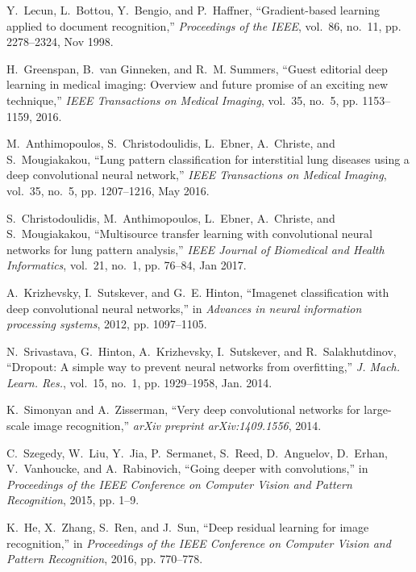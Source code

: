 \documentclass[journal]{IEEEtran}
\begin{document}
Y.~Lecun, L.~Bottou, Y.~Bengio, and P.~Haffner, ``Gradient-based learning
  applied to document recognition,'' \emph{Proceedings of the IEEE}, vol.~86,
  no.~11, pp. 2278--2324, Nov 1998.

H.~Greenspan, B.~van Ginneken, and R.~M. Summers, ``Guest editorial deep
  learning in medical imaging: Overview and future promise of an exciting new
  technique,'' \emph{IEEE Transactions on Medical Imaging}, vol.~35, no.~5, pp.
  1153--1159, 2016.

M.~Anthimopoulos, S.~Christodoulidis, L.~Ebner, A.~Christe, and S.~Mougiakakou,
  ``Lung pattern classification for interstitial lung diseases using a deep
  convolutional neural network,'' \emph{IEEE Transactions on Medical Imaging},
  vol.~35, no.~5, pp. 1207--1216, May 2016.

S.~Christodoulidis, M.~Anthimopoulos, L.~Ebner, A.~Christe, and S.~Mougiakakou,
  ``Multisource transfer learning with convolutional neural networks for lung
  pattern analysis,'' \emph{IEEE Journal of Biomedical and Health Informatics},
  vol.~21, no.~1, pp. 76--84, Jan 2017.

A.~Krizhevsky, I.~Sutskever, and G.~E. Hinton, ``Imagenet classification with
  deep convolutional neural networks,'' in \emph{Advances in neural information
  processing systems}, 2012, pp. 1097--1105.

\BIBentryALTinterwordspacing
N.~Srivastava, G.~Hinton, A.~Krizhevsky, I.~Sutskever, and R.~Salakhutdinov,
  ``Dropout: A simple way to prevent neural networks from overfitting,''
  \emph{J. Mach. Learn. Res.}, vol.~15, no.~1, pp. 1929--1958, Jan. 2014.
\BIBentrySTDinterwordspacing

K.~Simonyan and A.~Zisserman, ``Very deep convolutional networks for
  large-scale image recognition,'' \emph{arXiv preprint arXiv:1409.1556}, 2014.

C.~Szegedy, W.~Liu, Y.~Jia, P.~Sermanet, S.~Reed, D.~Anguelov, D.~Erhan,
  V.~Vanhoucke, and A.~Rabinovich, ``Going deeper with convolutions,'' in
  \emph{Proceedings of the IEEE Conference on Computer Vision and Pattern
  Recognition}, 2015, pp. 1--9.

K.~He, X.~Zhang, S.~Ren, and J.~Sun, ``Deep residual learning for image
  recognition,'' in \emph{Proceedings of the IEEE Conference on Computer Vision
  and Pattern Recognition}, 2016, pp. 770--778.
\end{document}
